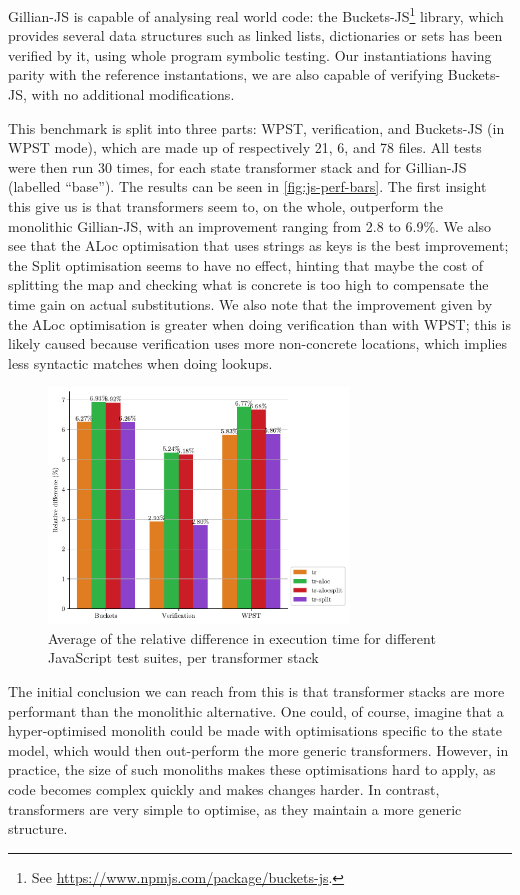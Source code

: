 Gillian-JS is capable of analysing real world code: the Buckets-JS\footnote{See \url{https://www.npmjs.com/package/buckets-js}.} library, which provides several data structures such as linked lists, dictionaries or sets has been verified by it, using whole program symbolic testing. Our instantiations having parity with the reference instantations, we are also capable of verifying Buckets-JS, with no additional modifications.

This benchmark is split into three parts: WPST, verification, and Buckets-JS (in WPST mode), which are made up of respectively 21, 6, and 78 files. All tests were then run 30 times, for each state transformer stack and for Gillian-JS (labelled ``base''). The results can be seen in \autoref{fig:js-perf-bars}. The first insight this give us is that transformers seem to, on the whole, outperform the monolithic Gillian-JS, with an improvement ranging from 2.8 to 6.9\%. We also see that the ALoc optimisation that uses strings as keys is the best improvement; the Split optimisation seems to have no effect, hinting that maybe the cost of splitting the map and checking what is concrete is too high to compensate the time gain on actual substitutions. We also note that the improvement given by the ALoc optimisation is greater when doing verification than with WPST; this is likely caused because verification uses more non-concrete locations, which implies less syntactic matches when doing lookups.

\begin{figure}
	\centering
	\includegraphics[width=8cm]{figures/js/avg_mode_relative_diff}
	\caption{Average of the relative difference in execution time for different JavaScript test suites, per transformer stack}
	\label{fig:js-perf-bars}
\end{figure}

The initial conclusion we can reach from this is that transformer stacks are more performant than the monolithic alternative. One could, of course, imagine that a hyper-optimised monolith could be made with optimisations specific to the state model, which would then out-perform the more generic transformers. However, in practice, the size of such monoliths makes these optimisations hard to apply, as code becomes complex quickly and makes changes harder. In contrast, transformers are very simple to optimise, as they maintain a more generic structure.

